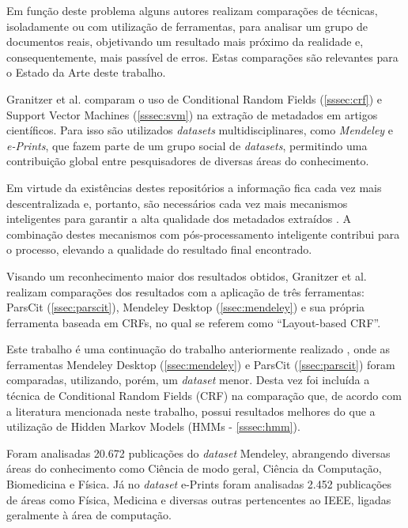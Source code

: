 Em função deste problema alguns autores realizam comparações de técnicas, isoladamente ou com utilização de ferramentas, para analisar um grupo de documentos reais, objetivando um resultado mais próximo da realidade e, consequentemente, mais passível de erros. Estas comparações são relevantes para o Estado da Arte deste trabalho.

Granitzer et al. \cite{Granitzer-2012-LayoutBased} comparam o uso de Conditional Random Fields (\autoref{sssec:crf}) e Support Vector Machines (\autoref{sssec:svm}) na extração de metadados em artigos científicos. Para isso são utilizados \emph{datasets} multidisciplinares, como \emph{Mendeley} e \emph{e-Prints}, que fazem parte de um grupo social de \emph{datasets}, permitindo uma contribuição global entre pesquisadores de diversas áreas do conhecimento.

Em virtude da existências destes repositórios a informação fica cada vez mais descentralizada e, portanto, são necessários cada vez mais mecanismos inteligentes para garantir a alta qualidade dos metadados extraídos \cite{Granitzer-2012-LayoutBased}. A combinação destes mecanismos com pós-processamento inteligente contribui para o processo, elevando a qualidade do resultado final encontrado.


Visando um reconhecimento maior dos resultados obtidos, Granitzer et al. realizam comparações dos resultados com a aplicação de três ferramentas: ParsCit (\autoref{ssec:parscit}), Mendeley Desktop (\autoref{ssec:mendeley}) e sua própria ferramenta baseada em CRFs, no qual se referem como ``Layout-based CRF''.

Este trabalho \cite{Granitzer-2012-LayoutBased} é uma continuação do trabalho anteriormente realizado \cite{Granitzer-2012-Crowdsourced}, onde as ferramentas Mendeley Desktop (\autoref{ssec:mendeley}) e ParsCit (\autoref{ssec:parscit}) foram comparadas, utilizando, porém, um \emph{dataset} menor. Desta vez foi incluída a técnica de Conditional Random Fields (CRF) na comparação que, de acordo com a literatura mencionada neste trabalho, possui resultados melhores do que a utilização de Hidden Markov Models (HMMs - \autoref{sssec:hmm}).

Foram analisadas 20.672 publicações do \emph{dataset} Mendeley, abrangendo diversas áreas do conhecimento como Ciência de modo geral, Ciência da Computação, Biomedicina e Física. Já no \emph{dataset} e-Prints foram analisadas 2.452 publicações de áreas como Física, Medicina e diversas outras pertencentes ao IEEE, ligadas geralmente à área de computação.

